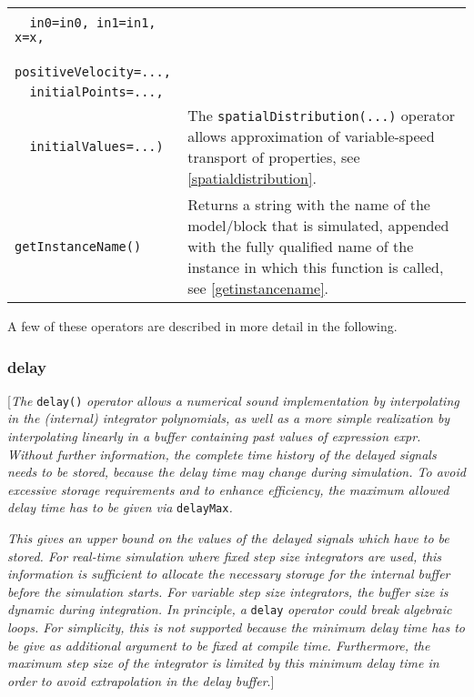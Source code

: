 \begin{longtable}{|p{5.1cm}|p{8cm}|}
\begin{tabular}{@{}p{5.1cm}@{}}
\lstinline!spatialDistribution(!\\
\lstinline!  in0=in0, in1=in1, x=x,!\\
\lstinline!  positiveVelocity=...,!\\
\lstinline!  initialPoints=...,!\\
\lstinline!  initialValues=...)!
\end{tabular} & 
The \lstinline!spatialDistribution(...)! operator allows approximation of
variable-speed transport of properties, see \autoref{spatialdistribution}.\\
\hline

\lstinline!getInstanceName()! & Returns a string with the name of the model/block
that is simulated, appended with the fully qualified name of the
instance in which this function is called, see \autoref{getinstancename}.\\ 
\hline
\end{longtable}

A few of these operators are described in more detail in the following.

\subsubsection{delay}

{[}\emph{The} \lstinline!delay()! \emph{operator allows a numerical sound
implementation by interpolating in the (internal) integrator
polynomials, as well as a more simple realization by interpolating
linearly in a buffer containing past values of expression expr. Without
further information, the complete time history of the delayed signals
needs to be stored, because the delay time may change during simulation.
To avoid excessive storage requirements and to enhance efficiency, the
maximum allowed delay time has to be given via} \lstinline!delayMax!\emph{. }

\emph{This gives an upper bound on the values of the delayed signals
which have to be stored. For real-time simulation where fixed step size
integrators are used, this information is sufficient to allocate the
necessary storage for the internal buffer before the simulation starts.
For variable step size integrators, the buffer size is dynamic during
integration. In principle, a} \lstinline!delay! \emph{operator could break algebraic
loops. For simplicity, this is not supported because the minimum delay
time has to be give as additional argument to be fixed at compile time.
Furthermore, the maximum step size of the integrator is limited by this
minimum delay time in order to avoid extrapolation in the delay
buffer}.{]}

